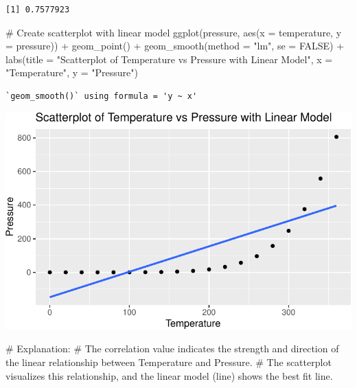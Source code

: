 \documentclass[
  letterpaper,
  DIV=11,
  numbers=noendperiod]{scrreprt}
\newenvironment{Shaded}{\begin{snugshade}}{\end{snugshade}}
\newcommand{\AttributeTok}[1]{\textcolor[rgb]{0.40,0.45,0.13}{#1}}
\newcommand{\CommentTok}[1]{\textcolor[rgb]{0.37,0.37,0.37}{#1}}
\newcommand{\ConstantTok}[1]{\textcolor[rgb]{0.56,0.35,0.01}{#1}}
\newcommand{\FunctionTok}[1]{\textcolor[rgb]{0.28,0.35,0.67}{#1}}
\newcommand{\NormalTok}[1]{\textcolor[rgb]{0.00,0.23,0.31}{#1}}
\newcommand{\SpecialCharTok}[1]{\textcolor[rgb]{0.37,0.37,0.37}{#1}}
\newcommand{\StringTok}[1]{\textcolor[rgb]{0.13,0.47,0.30}{#1}}
\begin{document}
\begin{verbatim}
[1] 0.7577923
\end{verbatim}

\begin{Shaded}
\begin{Highlighting}[]
\CommentTok{\# Create scatterplot with linear model}
\FunctionTok{ggplot}\NormalTok{(pressure, }\FunctionTok{aes}\NormalTok{(}\AttributeTok{x =}\NormalTok{ temperature, }\AttributeTok{y =}\NormalTok{ pressure)) }\SpecialCharTok{+}
  \FunctionTok{geom\_point}\NormalTok{() }\SpecialCharTok{+}
  \FunctionTok{geom\_smooth}\NormalTok{(}\AttributeTok{method =} \StringTok{"lm"}\NormalTok{, }\AttributeTok{se =} \ConstantTok{FALSE}\NormalTok{) }\SpecialCharTok{+}
  \FunctionTok{labs}\NormalTok{(}\AttributeTok{title =} \StringTok{"Scatterplot of Temperature vs Pressure with Linear Model"}\NormalTok{, }\AttributeTok{x =} \StringTok{"Temperature"}\NormalTok{, }\AttributeTok{y =} \StringTok{"Pressure"}\NormalTok{)}
\end{Highlighting}
\end{Shaded}

\begin{verbatim}
`geom_smooth()` using formula = 'y ~ x'
\end{verbatim}

\includegraphics{Linear_Modeling_and_Regression_files/figure-pdf/unnamed-chunk-22-1.pdf}

\begin{Shaded}
\begin{Highlighting}[]
\CommentTok{\# Explanation:}
\CommentTok{\# The correlation value indicates the strength and direction of the linear relationship between Temperature and Pressure.}
\CommentTok{\# The scatterplot visualizes this relationship, and the linear model (line) shows the best fit line.}
\end{Highlighting}
\end{Shaded}
\end{document}
